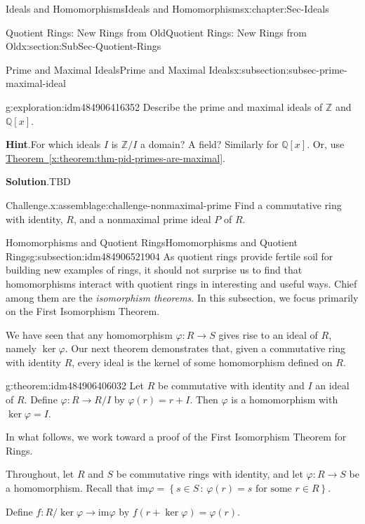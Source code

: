 \documentclass[oneside,10pt,]{book}
\newcommand{\blocktitlefont}{\relax}
\newcommand{\xreffont}{\relax}
\numberwithin{equation}{section}
\def\p{\varphi}
\def\im{\text{im}}
\newcommand{\setof}[2]{{\left\{#1\,\colon\,#2\right\}}}
\def\Z{{\mathbb Z}}
\def\Q{{\mathbb Q}}
\begin{document}
\begin{chapterptx}{Ideals and Homomorphisms}{}{Ideals and Homomorphisms}{}{}{x:chapter:Sec-Ideals}
\begin{sectionptx}{Quotient Rings: New Rings from Old}{}{Quotient Rings: New Rings from Old}{}{}{x:section:SubSec-Quotient-Rings}
\begin{subsectionptx}{Prime and Maximal Ideals}{}{Prime and Maximal Ideals}{}{}{x:subsection:subsec-prime-maximal-ideal}
\begin{exploration}{}{g:exploration:idm484906416352}
Describe the prime and maximal ideals of \(\Z\) and \(\Q[x]\).%
\par\smallskip%
\noindent
\textbf{\blocktitlefont Hint}.\hypertarget{g:hint:idm484906414944}{}\quad{}For which ideals \(I\) is \(\Z/I\) a domain? A field? Similarly for \(\Q[x]\). Or, use \hyperref[x:theorem:thm-pid-primes-are-maximal]{Theorem~{\xreffont\ref{x:theorem:thm-pid-primes-are-maximal}}}.\par\smallskip%
\noindent\textbf{\blocktitlefont Solution}.\hypertarget{g:solution:idm484906412832}{}\quad{}TBD\end{exploration}
\begin{assemblage}{Challenge.}{x:assemblage:challenge-nonmaximal-prime}%
Find a commutative ring with identity, \(R\), and a nonmaximal prime ideal \(P\) of \(R\).%
\end{assemblage}
\end{subsectionptx}
%
%
\typeout{************************************************}
\typeout{************************************************}
%
\begin{subsectionptx}{Homomorphisms and Quotient Rings}{}{Homomorphisms and Quotient Rings}{}{}{g:subsection:idm484906521904}
As quotient rings provide fertile soil for building new examples of rings, it should not surprise us to find that homomorphisms interact with quotient rings in interesting and useful ways. Chief among them are the \emph{isomorphism theorems}. In this subsection, we focus primarily on the First Isomorphism Theorem.%
\par
We have seen that any homomorphism \(\p : R\to S\) gives rise to an ideal of \(R\), namely \(\ker\p\). Our next theorem demonstrates that, given a commutative ring with identity \(R\), every ideal is the kernel of some homomorphism defined on \(R\).%
\begin{theorem}{}{}{g:theorem:idm484906406032}%
Let \(R\) be commutative with identity and \(I\) an ideal of \(R\). Define \(\p: R\to R/I\) by \(\p(r) = r+I\). Then \(\p\) is a homomorphism with \(\ker\p = I\).%
\end{theorem}
In what follows, we work toward a proof of the First Isomorphism Theorem for Rings.%
\par
Throughout, let \(R\) and \(S\) be commutative rings with identity, and let \(\p : R\to S\) be a homomorphism. Recall that \(\im \p = \setof{s\in S}{\p(r) = s\text{ for some } r\in R}\).%
\par
Define \(f: R/\ker \p \to \im \p\) by \(f(r+\ker \p) = \p(r)\).%

\end{subsectionptx}
\end{sectionptx}
\end{chapterptx}
\end{document}

